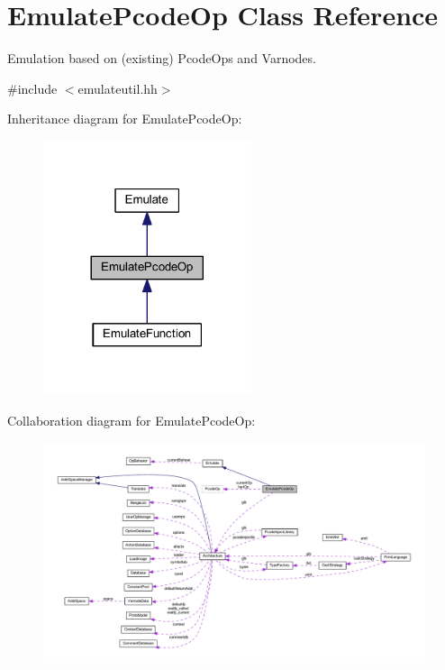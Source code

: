 \hypertarget{class_emulate_pcode_op}{}\section{Emulate\+Pcode\+Op Class Reference}
\label{class_emulate_pcode_op}


Emulation based on (existing) Pcode\+Ops and Varnodes.  




{\ttfamily \#include $<$emulateutil.\+hh$>$}



Inheritance diagram for Emulate\+Pcode\+Op\+:
\nopagebreak
\begin{figure}[H]
\begin{center}
\leavevmode
\includegraphics[width=173pt]{class_emulate_pcode_op__inherit__graph}
\end{center}
\end{figure}


Collaboration diagram for Emulate\+Pcode\+Op\+:
\nopagebreak
\begin{figure}[H]
\begin{center}
\leavevmode
\includegraphics[width=350pt]{class_emulate_pcode_op__coll__graph}
\end{center}
\end{figure}
